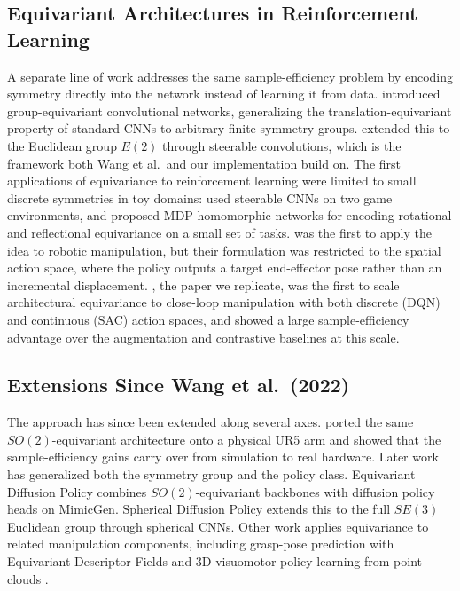 \documentclass[letterpaper]{article}
\begin{document}
\subsection{Equivariant Architectures in Reinforcement Learning}
A separate line of work addresses the same sample-efficiency problem by encoding symmetry directly into the network instead of learning it from data. \citet{cohen2016gcnn,cohen2016steerable} introduced group-equivariant convolutional networks, generalizing the translation-equivariant property of standard CNNs to arbitrary finite symmetry groups. \citet{weiler2019e2cnn} extended this to the Euclidean group $E(2)$ through steerable convolutions, which is the framework both Wang et al.\ and our implementation build on. The first applications of equivariance to reinforcement learning were limited to small discrete symmetries in toy domains: \citet{mondal2020group} used steerable CNNs on two game environments, and \citet{vanderpol2020mdp} proposed MDP homomorphic networks for encoding rotational and reflectional equivariance on a small set of tasks. \citet{wang2021equivariant} was the first to apply the idea to robotic manipulation, but their formulation was restricted to the spatial action space, where the policy outputs a target end-effector pose rather than an incremental displacement. \citet{wang2022so2}, the paper we replicate, was the first to scale architectural equivariance to close-loop manipulation with both discrete (DQN) and continuous (SAC) action spaces, and showed a large sample-efficiency advantage over the augmentation and contrastive baselines at this scale.

\subsection{Extensions Since Wang et al.\ (2022)}
The approach has since been extended along several axes. \citet{wang2022onrobot} ported the same $SO(2)$-equivariant architecture onto a physical UR5 arm and showed that the sample-efficiency gains carry over from simulation to real hardware. Later work has generalized both the symmetry group and the policy class. Equivariant Diffusion Policy \citep{wang2024diffusion} combines $SO(2)$-equivariant backbones with diffusion policy heads on MimicGen. Spherical Diffusion Policy \citep{spherical2025} extends this to the full $SE(3)$ Euclidean group through spherical CNNs. Other work applies equivariance to related manipulation components, including grasp-pose prediction with Equivariant Descriptor Fields \citep{ryu2023edf} and 3D visuomotor policy learning from point clouds \citep{equivariant3d2025}.
\end{document}
